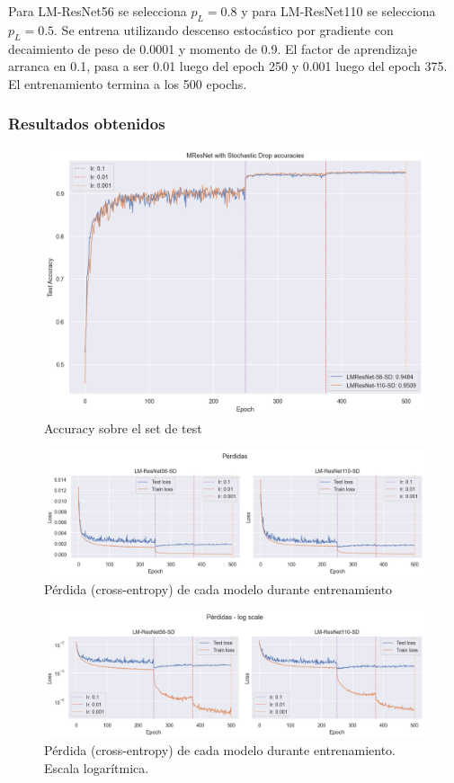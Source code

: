 \documentclass[titlepage,a4paper,oneside]{article}
\begin{document}
Para LM-ResNet56 se selecciona $p_L = 0.8$ y para LM-ResNet110 se selecciona $p_L = 0.5$. Se entrena utilizando descenso estocástico por gradiente con decaimiento de peso de 0.0001 y momento de 0.9. El factor de aprendizaje arranca en 0.1, pasa a ser 0.01 luego del epoch 250 y 0.001 luego del epoch 375. El entrenamiento termina a los 500 epochs.

\subsubsection{Resultados obtenidos}

\begin{figure}[H]
\centering
\includegraphics[width=\textwidth]{images/accuracy_sd.png}
\caption{Accuracy sobre el set de test}
\label{sd_test_set_acc}
\end{figure}

\begin{figure}[H]
\centering
\includegraphics[width=\textwidth]{images/loss_sd.png}
\caption{Pérdida (cross-entropy) de cada modelo durante entrenamiento}
\label{train_loss_sd}
\end{figure}

\begin{figure}[H]
\centering
\includegraphics[width=\textwidth]{images/loss_log_sd.png}
\caption{Pérdida (cross-entropy) de cada modelo durante entrenamiento. Escala logarítmica.}
\label{train_loss_log_sd}
\end{figure}
\end{document}
